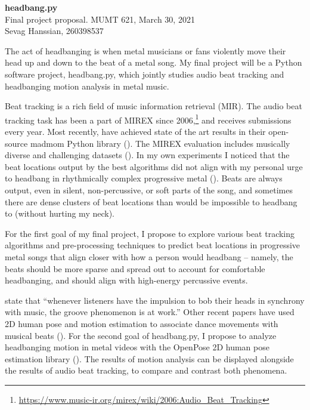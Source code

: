 \documentclass[letter,12pt]{report}
\begin{document}
\noindent\Large{\textbf{headbang.py}}\\
\large{Final project proposal. MUMT 621, March 30, 2021}\\
\large{Sevag Hanssian, 260398537}

\noindent\hrulefill

\vspace{2em}

The act of headbanging is when metal musicians or fans violently move their head up and down to the beat of a metal song. My final project will be a Python software project, headbang.py, which jointly studies audio beat tracking and headbanging motion analysis in metal music.

Beat tracking is a rich field of music information retrieval (MIR). The audio beat tracking task has been a part of MIREX since 2006,\footnote{\url{https://www.music-ir.org/mirex/wiki/2006:Audio_Beat_Tracking}} and receives submissions every year. Most recently, \textcite{bock1, bock2} have achieved state of the art results in their open-source madmom Python library (\cite{madmom}). The MIREX evaluation includes musically diverse and challenging datasets (\cite{beatmeta}). In my own experiments I noticed that the beat locations output by the best algorithms did not align with my personal urge to headbang in rhythmically complex progressive metal (\cite{meshuggah, periphery}). Beats are always output, even in silent, non-percussive, or soft parts of the song, and sometimes there are dense clusters of beat locations than would be impossible to headbang to (without hurting my neck).

For the first goal of my final project, I propose to explore various beat tracking algorithms and pre-processing techniques to predict beat locations in progressive metal songs that align closer with how a person would headbang -- namely, the beats should be more sparse and spread out to account for comfortable headbanging, and should align with high-energy percussive events.

\textcite{groove} state that ``whenever listeners have the impulsion to bob their heads in synchrony with music, the groove phenomenon is at work.'' Other recent papers have used 2D human pose and motion estimation to associate dance movements with musical beats (\cite{pose1, pose2}). For the second goal of headbang.py, I propose to analyze headbanging motion in metal videos with the OpenPose 2D human pose estimation library (\cite{openpose}). The results of motion analysis can be displayed alongside the results of audio beat tracking, to compare and contrast both phenomena.

\vfill
\clearpage

\printbibheading[title={\vspace{-3.5em}References},heading=bibnumbered]
\vspace{-1.5em}
\printbibliography[heading=none]
\end{document}
